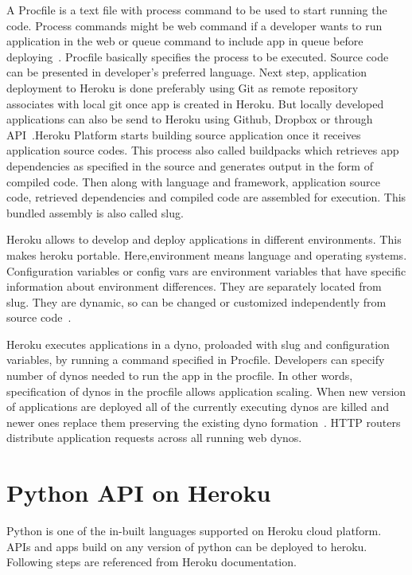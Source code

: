  A Procfile is a text file with 
 process command to be used to start running the code. Process commands might
 be web command if a developer wants to run application in the web or queue
 command to include app in queue before deploying~\cite{hid-sp18-415-www-how-heroku-works}.
 Procfile basically specifies the process to be executed.
 Source code can be presented in developer's preferred language.
 Next step, application deployment to Heroku is done preferably using Git
 as remote repository associates with local git  once app is created in Heroku.
 But locally developed applications can also be send to Heroku using Github,
 Dropbox or through API~\cite{hid-sp18-415-www-how-heroku-works}.Heroku Platform starts 
 building source application once it receives application source codes. This 
 process also called buildpacks which retrieves app dependencies as specified 
 in the source and generates output in the form of compiled code. Then along
 with language and framework, application source code, retrieved dependencies
 and compiled code are assembled for execution. This bundled assembly is also
 called slug.

 Heroku allows to develop and deploy applications in different environments.
 This makes heroku portable. Here,environment means language and operating
 systems. Configuration variables or config vars are environment variables
 that have specific information about environment differences. They are
 separately located from slug. They are dynamic, so can be changed or
 customized independently from source code~\cite{hid-sp18-415-www-how-heroku-works}.

 Heroku executes applications in a dyno, proloaded with slug and configuration
 variables, by running a command specified in Procfile. Developers can specify
 number of dynos needed to run the app in the procfile. In other words,
 specification of dynos in the procfile allows application scaling. When new
 version of applications are deployed all of the currently executing dynos are
 killed and newer ones replace them preserving the existing dyno
 formation~\cite{hid-sp18-415-www-how-heroku-works}. HTTP routers distribute application
 requests across all running web dynos. 


\section{Python API on Heroku}
 Python is one of the in-built languages supported on Heroku cloud platform.
 APIs and apps build on any version of python can be deployed to heroku.
 Following steps are referenced from Heroku documentation. 

